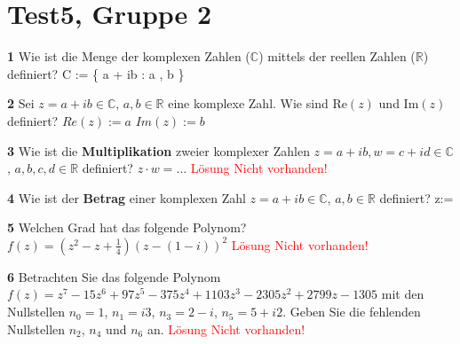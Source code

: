 \documentclass[11pt]{article}
\begin{document}
\section{Test5, Gruppe 2}

    \textbf{1} Wie ist die Menge der komplexen Zahlen (\(\mathbb{C}\)) mittels der reellen Zahlen (\(\mathbb{R}\)) definiert?\newline
    C := \{ a + ib : a \in {}, b \in {} \}\newline

    \textbf{2} Sei \( z = a + ib \in \mathbb{C} \), \( a,b \in \mathbb{R} \) eine komplexe Zahl. Wie sind \( \text{Re}(z) \) und \( \text{Im}(z) \) definiert?\newline
    $Re(z) := a$\newline
    $Im(z) := b$\newline

    \textbf{3} Wie ist die \textbf{Multiplikation} zweier komplexer Zahlen \( z = a + ib, w = c + id \in \mathbb{C} \), \( a,b,c,d \in \mathbb{R} \) definiert? \( z \cdot w = \ldots \)\newline
    \textcolor{red}{Lösung Nicht vorhanden!}\newline

    \textbf{4} Wie ist der \textbf{Betrag} einer komplexen Zahl \( z = a + ib \in \mathbb{C} \), \( a,b \in \mathbb{R} \) definiert?\newline
    \rvert z\rvert := \newline

    \textbf{5} Welchen Grad hat das folgende Polynom? \(f(z) = (z^2 - z + \frac{1}{4})(z - (1 - i))^2\)\newline
    \textcolor{red}{Lösung Nicht vorhanden!}\newline

    \textbf{6} Betrachten Sie das folgende Polynom \(f(z) = z^7 - 15z^6 + 97z^5 - 375z^4 + 1103z^3 - 2305z^2 + 2799z - 1305\) mit den Nullstellen \(n_0 = 1\), \(n_1 = i3\), \(n_3 = 2 - i\), \(n_5 = 5 + i2\). Geben Sie die fehlenden Nullstellen \(n_2\), \(n_4\) und \(n_6\) an.\newline
    \textcolor{red}{Lösung Nicht vorhanden!}\newline
\end{document}
